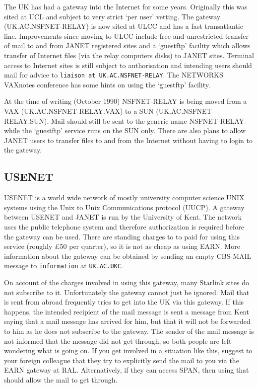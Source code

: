 The UK has had a gateway into the Internet for some years. Originally this was
sited at UCL and subject to very strict `per user' vetting. The gateway
(UK.AC.NSFNET-RELAY) is now sited at ULCC and has a fast transatlantic line.
Improvements since moving to ULCC include free and unrestricted transfer of
mail to and from JANET registered sites and a `guestftp' facility which allows
transfer of Internet files (via the relay computers disks) to JANET sites.
Terminal access to Internet sites is still subject to authorisation and
intending users should mail for advice to {\tt liaison at UK.AC.NSFNET-RELAY}.
The NETWORKS VAXnotes conference has some hints on using the `guestftp'
facility.

At the time of writing (October 1990) NSFNET-RELAY is being moved from a VAX
(UK.AC.NSFNET-RELAY.VAX) to a SUN (UK.AC.NSFNET-RELAY.SUN). Mail should still
be sent to the generic name NSFNET-RELAY while the `guestftp' service runs on
the SUN only. There are also plans to allow JANET users to transfer files to
and from the Internet without having to login to the gateway.

\subsection{USENET}

USENET is a world wide network of mostly university computer science UNIX
systems using the Unix to Unix Communications protocol (UUCP). A gateway
between USENET and JANET is run by the University of Kent. The network uses
the public telephone system and therefore authorization is required before
the gateway can be used. There are standing charges to to paid for using this
service (roughly \pounds 50 per quarter), so it is not as cheap as using EARN.
More information about the gateway can be obtained
by sending an empty CBS-MAIL message to {\tt information} at {\tt UK.AC.UKC}.

On account of the charges involved in using this gateway, many Starlink sites
do not subscribe to it. Unfortunately the gateway cannot just be ignored. Mail
that is sent from abroad frequently tries to get into the UK via this gateway.
If this happens, the intended recipient of the mail message is sent a message
from Kent saying that a mail message has arrived for him, but that it will not
be forwarded to him as he does not subscribe to the gateway. The sender of the
mail message is not informed that the message did not get through, so both
people are left wondering what is going on. If you get involved in a situation
like this, suggest to your foreign colleague that they try to explicitly send
the mail to you via the EARN gateway at RAL. Alternatively, if they can access
SPAN, then using that should allow the mail to get through.

